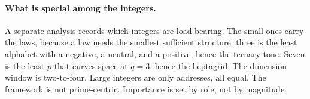\paragraph{What is special among the integers.}
A separate analysis records which integers are load-bearing. The small ones carry the laws, because
a law needs the smallest sufficient structure: three is the least alphabet with a negative, a
neutral, and a positive, hence the ternary tone. Seven is the least $p$ that curves space at
$q = 3$, hence the heptagrid. The dimension window is two-to-four. Large integers are only
addresses, all equal. The framework is not prime-centric. Importance is set by role, not by
magnitude.
